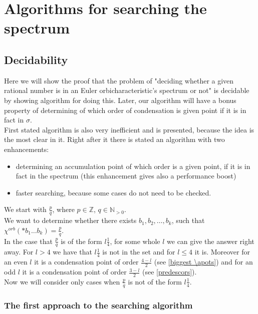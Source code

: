 \chapter{Algorithms for searching the spectrum}

\section{Decidability}
Here we will show the proof that the problem of "deciding whether a given rational number is in an 
Euler orbicharacteristic's spectrum or not" is decidable by showing algorithm for doing this. 
Later, our algorithm will have a bonus property of determining of which order of condensation 
is given point if it is in fact in $\sigma$. \\
First stated algorithm is also very inefficient and is presented, because the idea is the most 
clear in it. Right after it there is stated an algorithm with two enhancements: 
\begin{itemize}
\item determining an accumulation point of which order is a given point, if it is in fact in the 
spectrum (this enhancement gives also a performance boost)
\item faster searching, because some cases do not need to be checked. 
\end{itemize}
We start with $\frac{p}{q}$, where $p \in \mathbb{Z}$, $q \in \mathbb{N}_{>0}$. \\ 

We want to determine whether there exists $b_1,b_2,\dots,b_k$, such that $\chi^{orb}(*b_1\dots b_k) = 
\frac{p}{q}$. \\ 

In the case that $\frac{p}{q}$ is of the form $l\frac{1}{4}$, for some whole $l$ 
we can give the answer right away. For $l > 4$ we have that $l\frac{1}{4}$ is not in the set 
and for $l \leq 4$ it is. Moreover for an even $l$ it is a condensation point of order 
$\frac{4-l}{2}$ (see \ref{biggest \apots})
and for an odd $l$ it is a condensation point of order $\frac{3-l}{2}$ (see \ref{predescors}). \\

Now we will consider only cases when $\frac{p}{q}$ is not of the form $l\frac{1}{4}$.
\subsection{The first approach to the searching algorithm}

